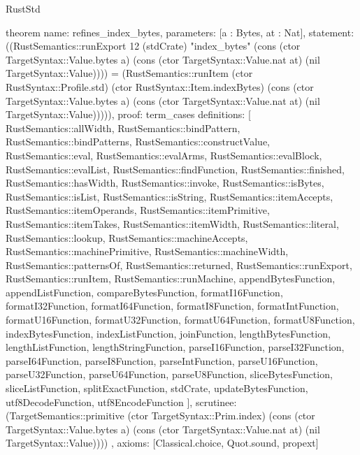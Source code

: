 \begin{lexlean}{RustStd}
\begin{semanticmodule}
theorem{
  name: refines_index_bytes,
  parameters: [a : Bytes, at : Nat],
  statement: ((RustSemantics::runExport 12 (stdCrate) "index_bytes" (cons (ctor TargetSyntax::Value.bytes a) (cons (ctor TargetSyntax::Value.nat at) (nil TargetSyntax::Value)))) = (RustSemantics::runItem (ctor RustSyntax::Profile.std) (ctor RustSyntax::Item.indexBytes) (cons (ctor TargetSyntax::Value.bytes a) (cons (ctor TargetSyntax::Value.nat at) (nil TargetSyntax::Value))))),
  proof: term_cases{
    definitions: [
      RustSemantics::allWidth,
      RustSemantics::bindPattern,
      RustSemantics::bindPatterns,
      RustSemantics::constructValue,
      RustSemantics::eval,
      RustSemantics::evalArms,
      RustSemantics::evalBlock,
      RustSemantics::evalList,
      RustSemantics::findFunction,
      RustSemantics::finished,
      RustSemantics::hasWidth,
      RustSemantics::invoke,
      RustSemantics::isBytes,
      RustSemantics::isList,
      RustSemantics::isString,
      RustSemantics::itemAccepts,
      RustSemantics::itemOperands,
      RustSemantics::itemPrimitive,
      RustSemantics::itemTakes,
      RustSemantics::itemWidth,
      RustSemantics::literal,
      RustSemantics::lookup,
      RustSemantics::machineAccepts,
      RustSemantics::machinePrimitive,
      RustSemantics::machineWidth,
      RustSemantics::patternsOf,
      RustSemantics::returned,
      RustSemantics::runExport,
      RustSemantics::runItem,
      RustSemantics::runMachine,
      appendBytesFunction,
      appendListFunction,
      compareBytesFunction,
      formatI16Function,
      formatI32Function,
      formatI64Function,
      formatI8Function,
      formatIntFunction,
      formatU16Function,
      formatU32Function,
      formatU64Function,
      formatU8Function,
      indexBytesFunction,
      indexListFunction,
      joinFunction,
      lengthBytesFunction,
      lengthListFunction,
      lengthStringFunction,
      parseI16Function,
      parseI32Function,
      parseI64Function,
      parseI8Function,
      parseIntFunction,
      parseU16Function,
      parseU32Function,
      parseU64Function,
      parseU8Function,
      sliceBytesFunction,
      sliceListFunction,
      splitExactFunction,
      stdCrate,
      updateBytesFunction,
      utf8DecodeFunction,
      utf8EncodeFunction
    ],
    scrutinee: (TargetSemantics::primitive (ctor TargetSyntax::Prim.index) (cons (ctor TargetSyntax::Value.bytes a) (cons (ctor TargetSyntax::Value.nat at) (nil TargetSyntax::Value))))
  },
  axioms: [Classical.choice, Quot.sound, propext]
}


\end{semanticmodule}
\end{lexlean}
